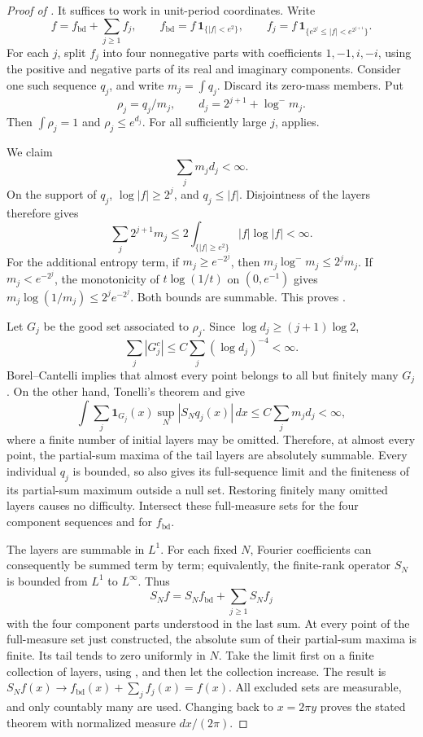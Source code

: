 \begin{proof}[Proof of ]
It suffices to work in unit-period coordinates. Write
\[
 f=f_{\mathrm{bd}}+\sum_{j\ge1}f_j,\qquad
 f_{\mathrm{bd}}=f\,\mathbf1_{\{|f|<e^2\}},\qquad
 f_j=f\,\mathbf1_{\{e^{2^j}\le|f|<e^{2^{j+1}}\}}.
\]
For each $j$, split $f_j$ into four nonnegative parts with coefficients
$1,-1,i,-i$, using the positive and negative parts of its real and
imaginary components. Consider one such sequence $q_j$, and write
$m_j=\int q_j$. Discard its zero-mass members. Put
\[
 \rho_j=q_j/m_j,\qquad
 d_j=2^{j+1}+\log^-m_j.
\]
Then $\int\rho_j=1$ and $\rho_j\le e^{d_j}$.
For all sufficiently large $j$,  applies.

We claim
\begin{equation}\label{eq:fourier-layer-cost}
                  \sum_j m_jd_j<\infty.
\end{equation}
On the support of $q_j$, $\log|f|\ge2^j$, and $q_j\le|f|$.
Disjointness of the layers therefore gives
\[
 \sum_j2^{j+1}m_j
 \le2\int_{\{|f|\ge e^2\}}|f|\log|f|<\infty.
\]
For the additional entropy term, if $m_j\ge e^{-2^j}$, then
$m_j\log^-m_j\le2^jm_j$. If $m_j<e^{-2^j}$, the monotonicity of
$t\log(1/t)$ on $(0,e^{-1})$ gives
$m_j\log(1/m_j)\le2^je^{-2^j}$. Both bounds are summable.
This proves .

Let $G_j$ be the good set associated to $\rho_j$. Since
$\log d_j\ge(j+1)\log2$,
\[
 \sum_j|G_j^c|\le C\sum_j(\log d_j)^{-4}<\infty.
\]
Borel--Cantelli implies that almost every point belongs to all but
finitely many $G_j$. On the other hand, Tonelli's theorem and
 give
\[
 \int\sum_j\mathbf1_{G_j}(x)\sup_N|S_Nq_j(x)|\,dx
 \le C\sum_jm_jd_j<\infty,
\]
where a finite number of initial layers may be omitted.
Therefore, at almost every point, the partial-sum maxima of the tail
layers are absolutely summable.
Every individual $q_j$ is bounded, so 
also gives its full-sequence limit and the finiteness of its
partial-sum maximum outside a null set. Restoring finitely many
omitted layers causes no difficulty.
Intersect these full-measure sets for the four component sequences
and for $f_{\mathrm{bd}}$.

The layers are summable in $L^1$. For each fixed $N$, Fourier
coefficients can consequently be summed term by term; equivalently,
the finite-rank operator $S_N$ is bounded from $L^1$ to $L^\infty$.
Thus
\[
 S_Nf=S_Nf_{\mathrm{bd}}+
       \sum_{j\ge1}S_Nf_j
\]
with the four component parts understood in the last sum.
At every point of the full-measure set just constructed, the absolute
sum of their partial-sum maxima is finite. Its tail tends to zero
uniformly in $N$. Take the limit first on a finite collection of
layers, using , and then let the collection
increase. The result is
$S_Nf(x)\to f_{\mathrm{bd}}(x)+\sum_jf_j(x)=f(x)$.
All excluded sets are measurable, and only countably many are used.
Changing back to $x=2\pi y$ proves the stated theorem with normalized
measure $dx/(2\pi)$.
\end{proof}

